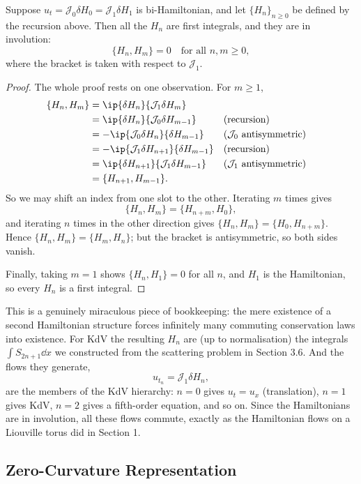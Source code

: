\begin{theorem}[Magri]
	Suppose $u_t = \mathcal J_0\delta H_0 = \mathcal J_1\delta H_1$ is bi-Hamiltonian, and let $\{H_n\}_{n\ge0}$ be defined by the recursion above. Then all the $H_n$ are first integrals, and they are in involution:
	$$
	\{H_n, H_m\} = 0\quad\text{for all }n,m\ge0,
	$$
	where the bracket is taken with respect to $\mathcal J_1$.
\end{theorem}
\begin{proof}
	The whole proof rests on one observation. For $m\ge1$,
	\begin{align*}
		\{H_n, H_m\} &= \ip{\delta H_n}{\mathcal J_1\delta H_m}\\
		&= \ip{\delta H_n}{\mathcal J_0\delta H_{m-1}} && \text{(recursion)}\\
		&= -\ip{\mathcal J_0\delta H_n}{\delta H_{m-1}} && \text{($\mathcal J_0$ antisymmetric)}\\
		&= -\ip{\mathcal J_1\delta H_{n+1}}{\delta H_{m-1}} && \text{(recursion)}\\
		&= \ip{\delta H_{n+1}}{\mathcal J_1\delta H_{m-1}} && \text{($\mathcal J_1$ antisymmetric)}\\
		&= \{H_{n+1}, H_{m-1}\}.
	\end{align*}
	So we may shift an index from one slot to the other. Iterating $m$ times gives
	$$
	\{H_n, H_m\} = \{H_{n+m}, H_0\},
	$$
	and iterating $n$ times in the other direction gives $\{H_n,H_m\} = \{H_0, H_{n+m}\}$. Hence $\{H_n, H_m\} = \{H_m, H_n\}$; but the bracket is antisymmetric, so both sides vanish.

	Finally, taking $m = 1$ shows $\{H_n, H_1\} = 0$ for all $n$, and $H_1$ is the Hamiltonian, so every $H_n$ is a first integral.
\end{proof}

This is a genuinely miraculous piece of bookkeeping: the mere existence of a second Hamiltonian structure forces infinitely many commuting conservation laws into existence. For KdV the resulting $H_n$ are (up to normalisation) the integrals $\int S_{2n+1}\dd x$ we constructed from the scattering problem in Section 3.6. And the flows they generate,
$$
u_{t_n} = \mathcal J_1\delta H_n,
$$
are the members of the KdV hierarchy: $n=0$ gives $u_t = u_x$ (translation), $n=1$ gives KdV, $n=2$ gives a fifth-order equation, and so on. Since the Hamiltonians are in involution, all these flows commute, exactly as the Hamiltonian flows on a Liouville torus did in Section 1.

\subsection{Zero-Curvature Representation}

